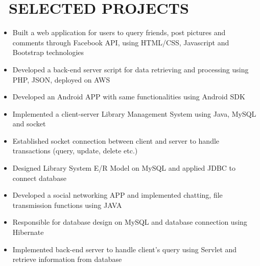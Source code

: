 \documentclass{resume}
\begin{document}
\vspace{-2mm}
\section{\faUsers\ SELECTED PROJECTS}
\vspace{-2mm}
\begin{itemize}
  \item Built a web application for users to query friends, post pictures and comments through Facebook API, using HTML/CSS, Javascript and Bootstrap technologies
  \item Developed a back-end server script for data retrieving and processing using PHP, JSON, deployed on AWS
  \item Developed an Android APP with same functionalities using Android SDK
\end{itemize}

\vspace{-3mm}
\begin{itemize}
  \item Implemented a client-server Library Management System using Java, MySQL and socket
  \item Established socket connection between client and server to handle transactions (query, update, delete etc.)
  \item Designed Library System E/R Model on MySQL and applied JDBC to connect database
\end{itemize}

\vspace{-3mm}
\begin{itemize}
  \item Developed a social networking APP and implemented chatting, file transmission functions using JAVA
  \item Responsible for database design on MySQL and database connection using Hibernate
  \item Implemented back-end server to handle client's query using Servlet and retrieve information from database
  \end{itemize}
\end{document}
